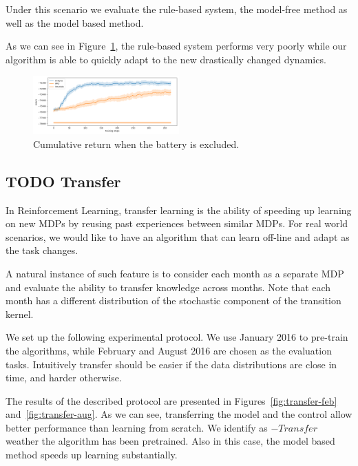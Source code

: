 \documentclass{article}
\begin{document}
Under this scenario we evaluate the rule-based system, the model-free method as well as the model based method.

As we can see in Figure~\ref{fig:change}, the rule-based system performs very poorly while our algorithm is able to quickly adapt to the new drastically changed dynamics.

    
    \begin{figure}[t]
    	\includegraphics[width=0.5\textwidth]{robustness.png}
    	\centering
    	\caption{Cumulative return when the battery is excluded.}
		\label{fig:change}
    \end{figure}
    

\subsection{\textbf{TODO} Transfer}

    In Reinforcement Learning, transfer learning is the ability of speeding up learning on new MDPs by reusing past experiences between similar MDPs. For real world scenarios, we would like to have an algorithm that can learn off-line and adapt as the task changes. 


    A natural instance of such feature is to consider each month as a separate MDP and evaluate the ability to transfer knowledge across months. Note that each month has a different distribution of the stochastic component of the transition kernel.
    
	We set up the following experimental protocol. We use January 2016 to pre-train the algorithms, while February and August 2016 are chosen as the evaluation tasks. Intuitively transfer should be easier if the data distributions are close in time, and harder otherwise.
	
    The results of the described protocol are presented in Figures~\ref{fig:transfer-feb} and~\ref{fig:transfer-aug}. As we can see, transferring the model and the control allow better performance than learning from scratch. We identify as $-Transfer$ weather the algorithm has been pretrained. Also in this case, the model based method speeds up learning substantially.
\end{document}

